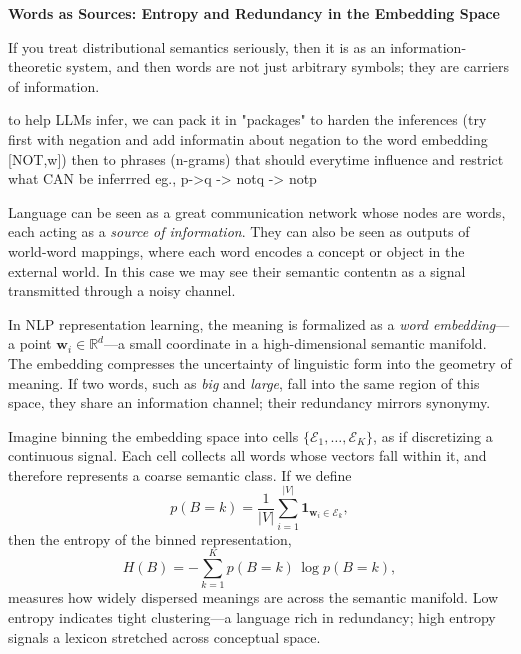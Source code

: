 \documentclass[12pt,a4paper]{article}
\begin{document}
\begin{center}
    {\Large\bf Words as Sources: Entropy and Redundancy in the Embedding Space}\\[0.5em]
\end{center}

If you treat  distributional semantics seriously, then it is as an information-theoretic system, 
and then words are not just arbitrary symbols; they are carriers of information.


to help LLMs infer, we can pack it in "packages" to harden the inferences 
(try first with negation and add informatin about negation to the word embedding [NOT,w]) 
then to phrases (n-grams) that should everytime influence and restrict what CAN be inferrred
eg., p->q -> notq -> notp

Language can be seen as a great communication network whose nodes are words, each acting as a {\it source of information}.  
They can also be seen as outputs of world-word mappings, where each word encodes a concept or object in the external world.
In this case we may see their semantic contentn as a signal transmitted through a noisy channel.

In NLP representation learning, the meaning is formalized as a {\it word embedding}---a point 
$\bm{w}_i \in \mathbb{R}^d$---a small coordinate in a high-dimensional semantic manifold.  
The embedding compresses the uncertainty of linguistic form into the geometry of meaning.  
If two words, such as \emph{big} and \emph{large}, fall into the same region of this space, 
they share an information channel; their redundancy mirrors synonymy.

\vspace{1em}

Imagine binning the embedding space into cells $\{ \mathcal{E}_1, \ldots, \mathcal{E}_K \}$, 
as if discretizing a continuous signal.  
Each cell collects all words whose vectors fall within it, and therefore represents a 
coarse semantic class.  
If we define
\begin{equation}
p(B=k) = \frac{1}{|V|}\sum_{i=1}^{|V|} \mathbf{1}_{\bm{w}_i \in \mathcal{E}_k},
\end{equation}
then the entropy of the binned representation,
\begin{equation}
H(B) = - \sum_{k=1}^{K} p(B=k)\,\log p(B=k),
\end{equation}
measures how widely dispersed meanings are across the semantic manifold.  
Low entropy indicates tight clustering---a language rich in redundancy;  
high entropy signals a lexicon stretched across conceptual space.
\end{document}
